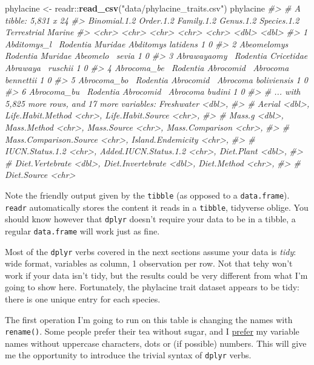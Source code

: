 \documentclass[]{book}
\newenvironment{Shaded}{}{}
\newcommand{\CommentTok}[1]{\textcolor[rgb]{0.38,0.63,0.69}{\textit{#1}}}
\newcommand{\KeywordTok}[1]{\textcolor[rgb]{0.00,0.44,0.13}{\textbf{#1}}}
\newcommand{\NormalTok}[1]{#1}
\newcommand{\OperatorTok}[1]{\textcolor[rgb]{0.40,0.40,0.40}{#1}}
\newcommand{\StringTok}[1]{\textcolor[rgb]{0.25,0.44,0.63}{#1}}
\begin{document}
\begin{Shaded}
\begin{Highlighting}[]
\NormalTok{phylacine <-}\StringTok{ }\NormalTok{readr}\OperatorTok{::}\KeywordTok{read_csv}\NormalTok{(}\StringTok{"data/phylacine_traits.csv"}\NormalTok{)}
\NormalTok{phylacine}
\CommentTok{#> # A tibble: 5,831 x 24}
\CommentTok{#>   Binomial.1.2 Order.1.2 Family.1.2 Genus.1.2 Species.1.2 Terrestrial Marine}
\CommentTok{#>   <chr>        <chr>     <chr>      <chr>     <chr>             <dbl>  <dbl>}
\CommentTok{#> 1 Abditomys_l~ Rodentia  Muridae    Abditomys latidens              1      0}
\CommentTok{#> 2 Abeomelomys~ Rodentia  Muridae    Abeomelo~ sevia                 1      0}
\CommentTok{#> 3 Abrawayaomy~ Rodentia  Cricetidae Abrawaya~ ruschii               1      0}
\CommentTok{#> 4 Abrocoma_be~ Rodentia  Abrocomid~ Abrocoma  bennettii             1      0}
\CommentTok{#> 5 Abrocoma_bo~ Rodentia  Abrocomid~ Abrocoma  boliviensis           1      0}
\CommentTok{#> 6 Abrocoma_bu~ Rodentia  Abrocomid~ Abrocoma  budini                1      0}
\CommentTok{#> # ... with 5,825 more rows, and 17 more variables: Freshwater <dbl>,}
\CommentTok{#> #   Aerial <dbl>, Life.Habit.Method <chr>, Life.Habit.Source <chr>,}
\CommentTok{#> #   Mass.g <dbl>, Mass.Method <chr>, Mass.Source <chr>, Mass.Comparison <chr>,}
\CommentTok{#> #   Mass.Comparison.Source <chr>, Island.Endemicity <chr>,}
\CommentTok{#> #   IUCN.Status.1.2 <chr>, Added.IUCN.Status.1.2 <chr>, Diet.Plant <dbl>,}
\CommentTok{#> #   Diet.Vertebrate <dbl>, Diet.Invertebrate <dbl>, Diet.Method <chr>,}
\CommentTok{#> #   Diet.Source <chr>}
\end{Highlighting}
\end{Shaded}

Note the friendly output given by the \texttt{tibble} (as opposed to a \texttt{data.frame}). \texttt{readr} automatically stores the content it reads in a \texttt{tibble}, tidyverse oblige. You should know however that \texttt{dplyr} doesn't require your data to be in a tibble, a regular \texttt{data.frame} will work just as fine.

Most of the \texttt{dplyr} verbs covered in the next sections assume your data is \emph{tidy}: wide format, variables as column, 1 observation per row. Not that tehy won't work if your data isn't tidy, but the results could be very different from what I'm going to show here. Fortunately, the phylacine trait dataset appears to be tidy: there is one unique entry for each species.

The first operation I'm going to run on this table is changing the names with
\texttt{rename()}. Some people prefer their tea without sugar, and I \href{https://style.tidyverse.org/syntax.html\#object-names}{prefer} my
variable names without uppercase characters, dots or (if possible) numbers.
This will give me the opportunity to introduce the trivial syntax
of \texttt{dplyr} verbs.
\end{document}
